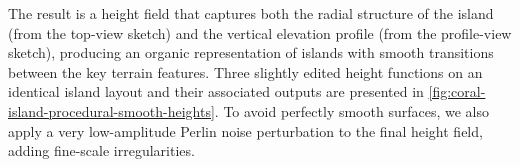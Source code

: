 




The result is a height field that captures both the radial structure of the island (from the top-view sketch) and the vertical elevation profile (from the profile-view sketch), producing an organic representation of islands with smooth transitions between the key terrain features. Three slightly edited height functions on an identical island layout and their associated outputs are presented in \cref{fig:coral-island-procedural-smooth-heights}. To avoid perfectly smooth surfaces, we also apply a very low-amplitude Perlin noise perturbation to the final height field, adding fine-scale irregularities.

